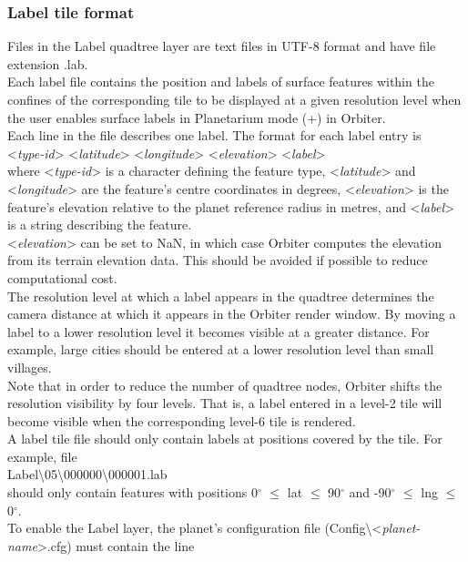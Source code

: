 \documentclass[Orbiter Developer Manual.tex]{subfiles}
\begin{document}
\subsubsection{Label tile format}
\label{sssec:label_tile_format}
Files in the Label quadtree layer are text files in UTF-8 format and have file extension .lab.\\
Each label file contains the position and labels of surface features within the confines of the corresponding tile to be displayed at a given resolution level when the user enables surface labels in Planetarium mode (\Ctrl+) in Orbiter.\\
Each line in the file describes one label. The format for each label entry is\\
\indent <\textit{type-id}> <\textit{latitude}> <\textit{longitude}> <\textit{elevation}> <\textit{label}>\\
where <\textit{type-id}> is a character defining the feature type, <\textit{latitude}> and <\textit{longitude}> are the feature's centre coordinates in degrees, <\textit{elevation}> is the feature's elevation relative to the planet reference radius in metres, and <\textit{label}> is a string describing the feature.\\
<\textit{elevation}> can be set to NaN, in which case Orbiter computes the elevation from its terrain elevation data. This should be avoided if possible to reduce computational cost.\\
The resolution level at which a label appears in the quadtree determines the camera distance at which it appears in the Orbiter render window. By moving a label to a lower resolution level it becomes visible at a greater distance. For example, large cities should be entered at a lower resolution level than small villages.\\
Note that in order to reduce the number of quadtree nodes, Orbiter shifts the resolution visibility by four levels. That is, a label entered in a level-2 tile will become visible when the corresponding level-6 tile is rendered.\\
A label tile file should only contain labels at positions covered by the tile. For example, file\\
\indent Label\textbackslash 05\textbackslash 000000\textbackslash 000001.lab\\
should only contain features with positions 0$^{\circ}$ $\leq$ lat $\leq$ 90$^{\circ}$ and -90$^{\circ}$ $\leq$ lng $\leq$ 0$^{\circ}$.\\
To enable the Label layer, the planet's configuration file (Config\textbackslash <\textit{planet-name}>.cfg) must contain the line\\
\end{document}
